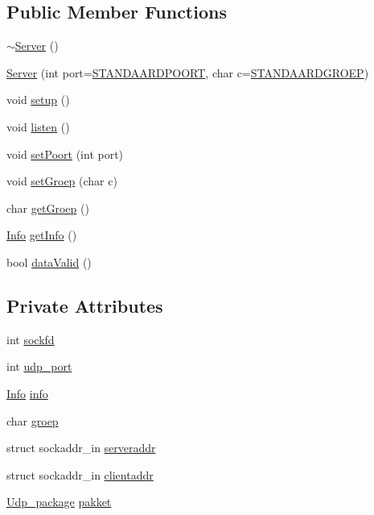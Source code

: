 \subsection*{Public Member Functions}
\begin{DoxyCompactItemize}
\item 
\hyperlink{classServer_a4b3aa2579cb1c8cd1d069582c14d0fa6}{$\sim$\-Server} ()
\item 
\hyperlink{classServer_a81ef5528c64630e6c63bcfec1cc42317}{Server} (int port=\hyperlink{Server_8h_aba1a0da5373c381e0ad6481f8333c08a}{S\-T\-A\-N\-D\-A\-A\-R\-D\-P\-O\-O\-R\-T}, char c=\hyperlink{Server_8h_ab52a72e164e6995d7693a24dc3c43472}{S\-T\-A\-N\-D\-A\-A\-R\-D\-G\-R\-O\-E\-P})
\item 
void \hyperlink{classServer_ac2cf171fbcae23064b0139707e84a67c}{setup} ()
\item 
void \hyperlink{classServer_a83ae4701038e91258108a7701521cf78}{listen} ()
\item 
void \hyperlink{classServer_a972ee33b92b171ceb776e070ad892c98}{set\-Poort} (int port)
\item 
void \hyperlink{classServer_a7ce1f889e537ab405ad675b67d0f5380}{set\-Groep} (char c)
\item 
char \hyperlink{classServer_a25fc1f6dc4bf1bf674a416022587792a}{get\-Groep} ()
\item 
\hyperlink{structInfo}{Info} \hyperlink{classServer_a13eed202f15d451fa877233fcb58b5d4}{get\-Info} ()
\item 
bool \hyperlink{classServer_a162257cf71d621f37bd2fee3d554d029}{data\-Valid} ()
\end{DoxyCompactItemize}
\subsection*{Private Attributes}
\begin{DoxyCompactItemize}
\item 
int \hyperlink{classServer_a284abf5ae92eeed0f5e28759d382dd2d}{sockfd}
\item 
int \hyperlink{classServer_a60a838db7cee44ea45979e93c75137dd}{udp\-\_\-port}
\item 
\hyperlink{structInfo}{Info} \hyperlink{classServer_ae9d320c11dc676f6a24e41171bdd3beb}{info}
\item 
char \hyperlink{classServer_ae63c2574fcde32ea16b06b0bcb61b716}{groep}
\item 
struct sockaddr\-\_\-in \hyperlink{classServer_ac23e7b8d798bffefe61206636a8e1f57}{serveraddr}
\item 
struct sockaddr\-\_\-in \hyperlink{classServer_aa98c616c610a9f34a62b6c9f71ef7309}{clientaddr}
\item 
\hyperlink{structUdp__package}{Udp\-\_\-package} \hyperlink{classServer_a7850c5e7c92a04edbbd682d6553c18c8}{pakket}
\end{DoxyCompactItemize}


